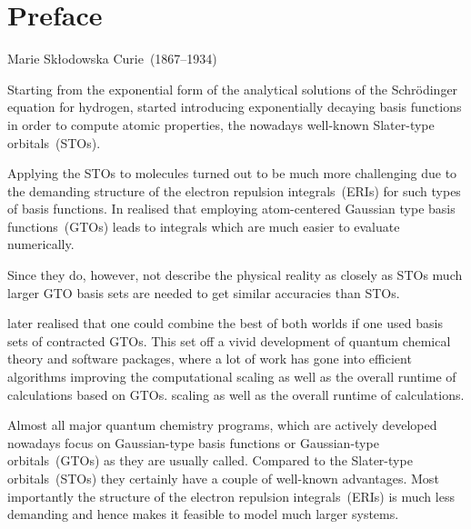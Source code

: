 \chapter{Preface}
{Marie Skłodowska Curie~(1867--1934)}



Starting from the exponential form of the analytical solutions of the
Schrödinger equation for hydrogen,
\citet{Slater1930} started introducing exponentially decaying basis functions
in order to compute atomic properties,
the nowadays well-known Slater-type orbitals~(STOs).

Applying the STOs to molecules turned out to be much more
challenging due to the demanding structure of the electron repulsion integrals~(ERIs)
for such types of basis functions.
In \citeyear{Boys1950} \citeauthor{Boys1950} realised that employing
atom-centered Gaussian type basis functions~(GTOs) leads to integrals
which are much easier to evaluate numerically.

Since they do, however, not describe the physical reality as closely as STOs
much larger GTO basis sets are needed to get similar accuracies than STOs.

\citet{Hehre1969} later realised that one could combine the best of both
worlds if one used
basis sets of contracted GTOs.
This set off a vivid development of quantum chemical theory and software packages,
where a lot of work has gone into efficient algorithms
improving the computational
scaling as well as the overall runtime of calculations based on GTOs.
scaling as well as the overall runtime of calculations.

Almost all major quantum chemistry programs,
which are actively developed nowadays focus on Gaussian-type
basis functions or Gaussian-type orbitals~(GTOs) as they are usually called.
Compared to the Slater-type orbitals~(STOs)
they certainly have a couple of well-known advantages.
Most importantly the structure of the electron repulsion integrals~(ERIs)
is much less demanding and hence makes it feasible to model much larger systems.

